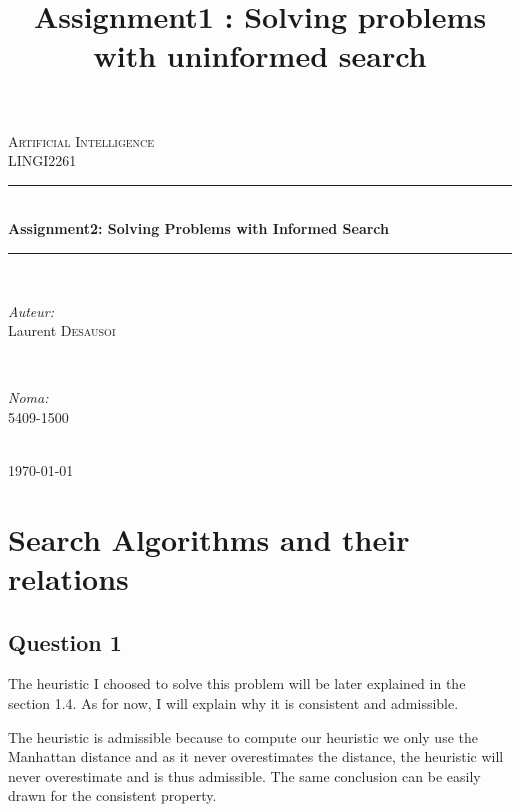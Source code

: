 \documentclass[a4paper,11pt]{article}
\title{Assignment1 : Solving problems with uninformed search}
\newenvironment{vcenterpage}
{\newpage\vspace*{\fill}}
{\vspace*{\fill}\par\pagebreak}
\begin{document}
\begin{titlepage}
    \begin{vcenterpage}
\newcommand{\HRule}{\rule{\linewidth}{0.5mm}} 

\center 

\textsc{\LARGE Artificial Intelligence}\\[1.5cm] 
\textsc{\Large \textsc{LINGI2261}}\\[0.5cm] 

\HRule \\[0.8cm]
{ \huge \bfseries Assignment2: Solving Problems with Informed Search}\\[0.4cm] 
\HRule \\[1.5cm]

\begin{minipage}{0.4\textwidth}
\begin{flushleft} \large
\emph{Auteur:}\\
Laurent \textsc{Desausoi}\\
\end{flushleft}
\end{minipage}
~
\begin{minipage}{0.4\textwidth}
\begin{flushright} \large
\emph{Noma:} \\
\textsc{5409-1500}
\end{flushright}
\end{minipage}\\[4cm]

{\large \today}\\[3cm] 

\end{vcenterpage}
\end{titlepage}


\section{Search Algorithms and their relations}
	\subsection{Question 1}
		\par The heuristic I choosed to solve this problem will be later explained in the section 1.4. As for now, I will explain why it is consistent and admissible.
		\par The heuristic is admissible because to compute our heuristic we only use the Manhattan distance and as it never overestimates the distance, the heuristic will never overestimate and is thus admissible. The same conclusion can be easily drawn for the consistent property.
\end{document}
